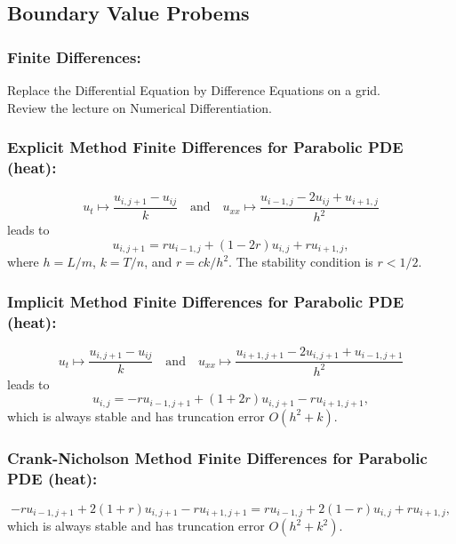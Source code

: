 \subsection*{Boundary Value Probems}

\subsubsection*{Finite Differences:}
Replace the Differential Equation by Difference Equations on a grid.\\
Review the lecture on Numerical Differentiation.


\subsubsection*{Explicit Method Finite Differences for Parabolic PDE (heat):}
\begin{equation}
u_t \mapsto \frac{u_{i,j+1} - u_{ij}}{k}
\quad\text{and}
\quad u_{xx} \mapsto  \frac{u_{i-1,j} - 2 u_{ij} + u_{i+1,j} }{h^2}
\end{equation}
leads to
\begin{equation*}
u_{i,j+1} = r u_{i-1,j} + (1 - 2r) u_{i,j} + r u_{i+1,j},
\end{equation*}
where $h = L/m$, $k = T/n$, and $r = {ck}/{h^2}$. The stability
condition is $r<1/2$.

\subsubsection*{Implicit Method Finite Differences for Parabolic PDE (heat):}
\begin{equation}
u_t \mapsto \frac{u_{i,j+1} - u_{ij}}{k} 
\quad\text{and}
\quad u_{xx} \mapsto  \frac{u_{i+1,j+1} - 2 u_{i,j+1} + u_{i-1,j+1} }{h^2}
\end{equation}
leads to
\begin{equation*}
u_{i,j} = -r u_{i-1,j+1} + (1+2r) u_{i,j+1} - r u_{i+1,j+1},
\end{equation*}
which is always stable and has truncation error $O(h^2+k)$.

\subsubsection*{Crank-Nicholson Method Finite Differences for Parabolic PDE (heat):}
$$
  -r u_{i-1,j+1} + 2(1+r) u_{i,j+1} - r u_{i+1,j+1}
       = r u_{i-1,j} + 2(1-r) u_{i,j} + r u_{i+1,j},
$$
which is always stable and has truncation error $O(h^2+k^2)$. 

